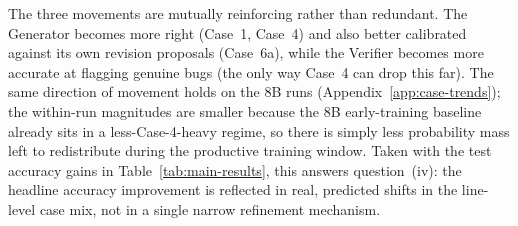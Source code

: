 The three movements are mutually reinforcing rather than redundant. The
Generator becomes more right (Case~1, Case~4) and also better
calibrated against its own revision proposals (Case~6a), while the
Verifier becomes more accurate at flagging genuine bugs (the only way
Case~4 can drop
this far). The same direction of movement holds on the 8B runs
(Appendix~\ref{app:case-trends}); the within-run magnitudes are smaller
because the 8B early-training baseline already sits in a
less-Case-4-heavy regime, so there is simply less probability mass left
to redistribute during the productive training window. Taken with the test
accuracy gains in Table~\ref{tab:main-results}, this answers
question~(iv): the headline accuracy improvement is reflected in real,
predicted shifts in the line-level case mix, not in a single
narrow refinement mechanism.
